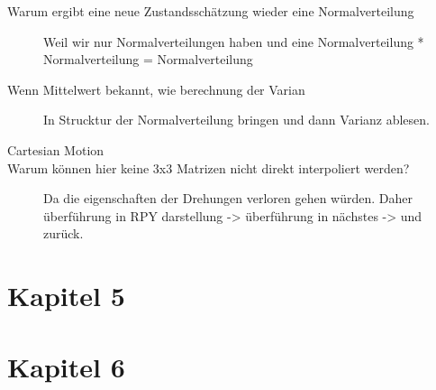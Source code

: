 \begin{description}
	\item[Warum ergibt eine neue Zustandsschätzung wieder eine Normalverteilung] Weil wir nur Normalverteilungen haben und eine Normalverteilung * Normalverteilung = Normalverteilung
	\item[Wenn Mittelwert bekannt, wie berechnung der Varian] In Strucktur der Normalverteilung bringen und dann Varianz ablesen.
	\item[Cartesian Motion] 
	\item[Warum können hier keine 3x3 Matrizen nicht direkt interpoliert werden?] Da die eigenschaften der Drehungen verloren gehen würden. Daher überführung in RPY darstellung -> überführung in nächstes -> und zurück.
\end{description} 

\section{Kapitel 5}
\label{sec:faq:kap5}

\section{Kapitel 6}
\label{sec:faq:kap6}

\cite{test}